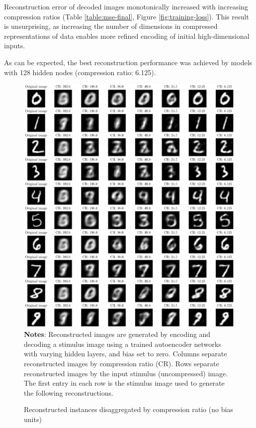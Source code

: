 
Reconstruction error of decoded images monotonically increased with increasing compression ratios (Table \ref{table:mse-final}, Figure \ref{fig:training-loss}).
This result is unsurprising, as increasing the number of dimensions in compressed representations of data enables more refined encoding of initial high-dimensional inputs.

As can be expected, the best reconstruction performance was achieved by models with 128 hidden nodes (compression ratio: 6.125).

\begin{figure}
    \caption{Reconstructed instances disaggregated by compression ratio (no bias units)}
	\label{fig:decoded-instances}
	\includegraphics[width=1.0\textwidth]{graphics/decoded_instances.pdf}
    \textbf{Notes}: Reconstructed images are generated by encoding and decoding a stimulus image using a trained autoencoder networks with varying hidden layers, and bias set to zero. Columns separate reconstructed images by compression ratio (CR). Rows separate reconstructed images by the input stimulus (uncompressed) image. The first entry in each row is the stimulus image used to generate the following reconstructions.
\end{figure}

